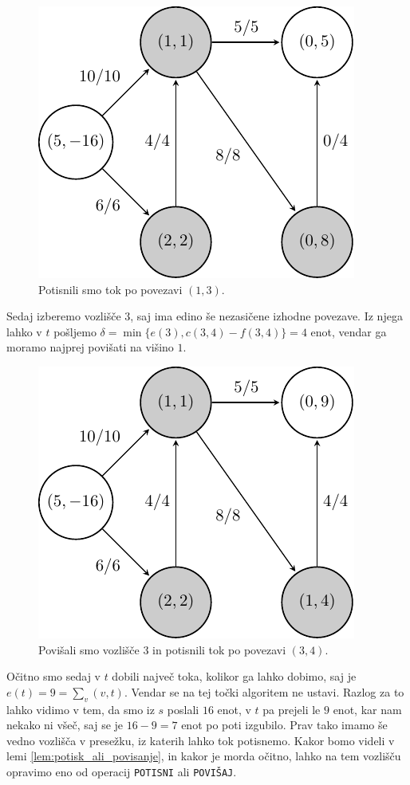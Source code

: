 \documentclass[mat1]{fmfdelo}
\begin{document}
\begin{figure}[H]
  \centering
  \includegraphics{images/graf2-5.pdf}
  \caption{Potisnili smo tok po povezavi $(1,3)$.}
\end{figure}

Sedaj izberemo vozlišče $3$, saj ima edino še nezasičene izhodne povezave. Iz njega lahko v $t$ pošljemo $\delta = \min\{e(3), c(3,4) - f(3,4)\} = 4$ enot,
vendar ga moramo najprej povišati na višino $1$.

\begin{figure}[H]
  \centering
  \includegraphics{images/graf2-6.pdf}
  \caption{Povišali smo vozlišče $3$ in potisnili tok po povezavi $(3,4)$.}
\end{figure}

Očitno smo sedaj v $t$ dobili največ toka, kolikor ga lahko dobimo, saj je $e(t) = 9 = \sum_v (v,t)$. Vendar se na tej točki algoritem ne ustavi. Razlog za to
lahko vidimo v tem, da smo iz $s$ poslali $16$ enot, v $t$ pa prejeli le $9$ enot, kar nam nekako ni všeč, saj se je $16-9 = 7$ enot po poti izgubilo. Prav tako
imamo še vedno vozlišča v presežku, iz katerih lahko tok potisnemo. Kakor bomo videli v lemi \ref{lem:potisk_ali_povisanje}, in kakor je morda očitno, lahko na tem
vozlišču opravimo eno od operacij \texttt{POTISNI} ali \texttt{POVIŠAJ}.
\end{document}
